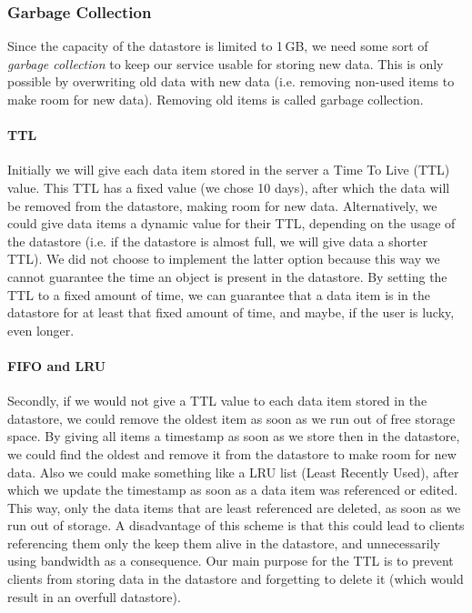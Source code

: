 \subsubsection{Garbage Collection}
Since the capacity of the datastore is limited to 1\,GB, we need some sort of
\emph{garbage collection} to keep our service usable for storing new data. This
is only possible by overwriting old data with new data (i.e. removing non-used
items to make room for new data). Removing old items is called garbage
collection.

\paragraph{TTL}
Initially we will give each data item stored in the server a Time To Live (TTL)
value. This TTL has a fixed value (we chose 10 days), after which the data will
be removed from the datastore, making room for new data. Alternatively, we could
give data items a dynamic value for their TTL, depending on the usage of the
datastore (i.e. if the datastore is almost full, we will give data a shorter
TTL). We did not choose to implement the latter option because this way we
cannot guarantee the time an object is present in the datastore. By setting the
TTL to a fixed amount of time, we can guarantee that a data item is in the
datastore for at least that fixed amount of time, and maybe, if the user is
lucky, even longer.

\paragraph{FIFO and LRU}
Secondly, if we would not give a TTL value to each data item stored in the
datastore, we could remove the oldest item as soon as we run out of free storage
space. By giving all items a timestamp as soon as we store then in the datastore,
we could find the oldest and remove it from the datastore to make room for new
data. Also we could make something like a LRU list (Least Recently Used), after
which we update the timestamp as soon as a data item was referenced or edited.
This way, only the data items that are least referenced are deleted, as soon as
we run out of storage. A disadvantage of this scheme is that this could lead to
clients referencing them only the keep them alive in the datastore, and
unnecessarily using bandwidth as a consequence. Our main purpose for the TTL is
to prevent clients from storing data in the datastore and forgetting to delete it
(which would result in an overfull datastore).


